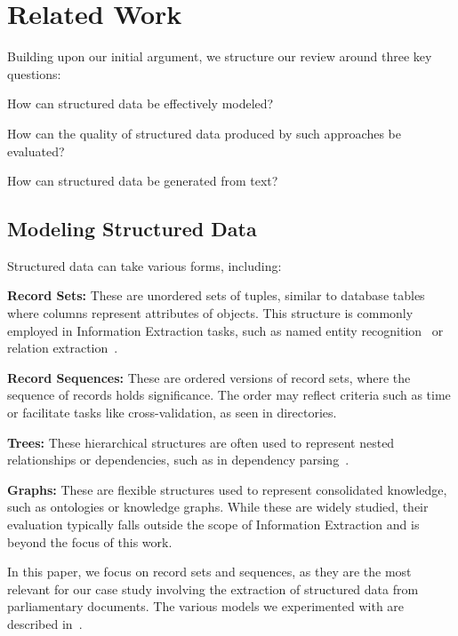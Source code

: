 \section{Related Work}
\label{sec:related-work}

Building upon our initial argument, we structure our review around three key questions: 
\begin{inparaenum}[(1)]
    \item How can structured data be effectively modeled? 
    \item How can the quality of structured data produced by such approaches be evaluated? 
    \item How can structured data be generated from text?
\end{inparaenum}

\subsection{Modeling Structured Data}
\label{sec:modeling-structured-data}

Structured data can take various forms, including: 

\textbf{Record Sets:} These are unordered sets of tuples, similar to database tables where columns represent attributes of objects. This structure is commonly employed in Information Extraction tasks, such as named entity recognition~\cite{nadeau_survey_2007} or relation extraction~\cite{mintz_distant_2009}.

\textbf{Record Sequences:} These are ordered versions of record sets, where the sequence of records holds significance. The order may reflect criteria such as time or facilitate tasks like cross-validation, as seen in directories.

\textbf{Trees:} These hierarchical structures are often used to represent nested relationships or dependencies, such as in dependency parsing~\cite{de-marneffe-etal-2014-universal}.

\textbf{Graphs:} These are flexible structures used to represent consolidated knowledge, such as ontologies or knowledge graphs. While these are widely studied, their evaluation typically falls outside the scope of Information Extraction and is beyond the focus of this work.

In this paper, we focus on record sets and sequences, as they are the most relevant for our case study involving the extraction of structured data from parliamentary documents. The various models we experimented with are described in~.


